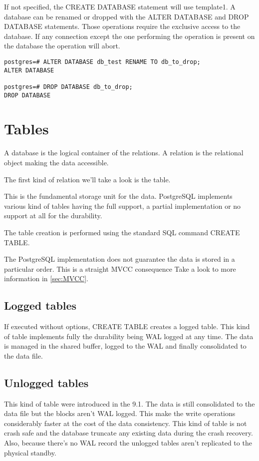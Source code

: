 If not specified, the CREATE DATABASE  statement will use template1. 
A database can be renamed or dropped with the ALTER DATABASE and DROP DATABASE 
statements. Those operations require the exclusive access to the database. If 
any connection except the one performing the operation is present on the 
database the operation will abort.


\begin{verbatim}
postgres=# ALTER DATABASE db_test RENAME TO db_to_drop;
ALTER DATABASE

postgres=# DROP DATABASE db_to_drop;
DROP DATABASE

\end{verbatim}




\section{Tables}
\label{sec:TABLES}
A database is the logical container of the relations.
A relation is the relational object making the data accessible.

The first kind of relation we'll take a look is the table.

This is the fundamental storage unit for the data. PostgreSQL implements 
various kind of tables having the full support, a partial implementation or no 
support at all for the durability.

The table creation is performed using the standard SQL command CREATE TABLE. 

The PostgreSQL implementation does not guarantee the data is stored in a 
particular order. This is a straight MVCC consequence Take a look to 
more information in \ref{sec:MVCC}. 

\subsection{Logged tables}
If executed without options, CREATE TABLE creates a logged table. This kind of 
table implements fully the durability being WAL logged at any time. The data is 
managed in the shared buffer, logged to the WAL and finally consolidated to the 
data file. 

\subsection{Unlogged tables}
\label{sub:UNLOGGEDTABLES}
This kind of table were introduced in the 9.1. The data is still consolidated 
to the data file but the blocks aren't WAL logged. This make the write 
operations considerably faster at the cost of the data consistency. This kind 
of table is not crash safe and the database truncate any existing data during 
the crash recovery. Also, because there's no WAL record the unlogged tables 
aren't replicated to the physical standby. 


